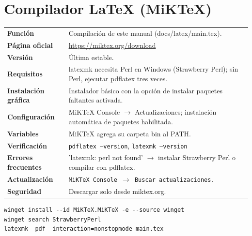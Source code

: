 \section{Compilador LaTeX (MiKTeX)}
{\small\begin{tabularx}{\linewidth}{@{}>{\bfseries}p{2.9cm}X@{}}\toprule
Función & Compilación de este manual (docs/latex/main.tex).\\
Página oficial & \url{https://miktex.org/download}\\
Versión & Última estable.\\
Requisitos & latexmk necesita Perl en Windows (Strawberry Perl); sin Perl, ejecutar pdflatex tres veces.\\
Instalación gráfica & Instalador básico con la opción de instalar paquetes faltantes activada.\\
Configuración & MiKTeX Console $\rightarrow$ Actualizaciones; instalación automática de paquetes habilitada.\\
Variables & MiKTeX agrega su carpeta bin al PATH.\\
Verificación & \texttt{pdflatex --version}, \texttt{latexmk --version}\\
Errores frecuentes & 'latexmk: perl not found' $\rightarrow$ instalar Strawberry Perl o compilar con pdflatex.\\
Actualización & \texttt{MiKTeX Console $\rightarrow$ Buscar actualizaciones.}\\
Seguridad & Descargar solo desde miktex.org.\\
\bottomrule\end{tabularx}}
\begin{lstlisting}[style=ps]
winget install --id MiKTeX.MiKTeX -e --source winget
winget search StrawberryPerl
latexmk -pdf -interaction=nonstopmode main.tex
\end{lstlisting}
